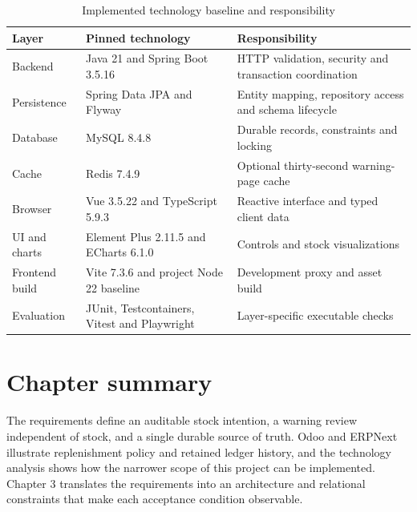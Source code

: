 \begin{table}[htbp]\centering\small{}\setlength{\tabcolsep}{3pt}\renewcommand{\arraystretch}{1.25}
\caption{Implemented technology baseline and responsibility}\label{tab:stack}
\begin{tabular}{>{\raggedright\arraybackslash}p{}>{\raggedright\arraybackslash}p{}>{\raggedright\arraybackslash}p{}}
\toprule
\textbf{Layer} & \textbf{Pinned technology} & \textbf{Responsibility} \\
\midrule
\leavevmode{}Backend & \leavevmode{}Java 21 and Spring Boot 3.5.16 & \leavevmode{}HTTP validation, security and transaction coordination \\
\leavevmode{}Persistence & \leavevmode{}Spring Data JPA and Flyway & \leavevmode{}Entity mapping, repository access and schema lifecycle \\
\leavevmode{}Database & \leavevmode{}MySQL 8.4.8 & \leavevmode{}Durable records, constraints and locking \\
\leavevmode{}Cache & \leavevmode{}Redis 7.4.9 & \leavevmode{}Optional thirty-second warning-page cache \\
\leavevmode{}Browser & \leavevmode{}Vue 3.5.22 and TypeScript 5.9.3 & \leavevmode{}Reactive interface and typed client data \\
\leavevmode{}UI and charts & \leavevmode{}Element Plus 2.11.5 and ECharts 6.1.0 & \leavevmode{}Controls and stock visualizations \\
\leavevmode{}Frontend build & \leavevmode{}Vite 7.3.6 and project Node 22 baseline & \leavevmode{}Development proxy and asset build \\
\leavevmode{}Evaluation & \leavevmode{}JUnit, Testcontainers, Vitest and Playwright & \leavevmode{}Layer-specific executable checks \\
\bottomrule\end{tabular}\end{table}

\FloatBarrier

\section{Chapter summary}

The requirements define an auditable stock intention, a warning review independent of stock, and a single durable source of truth. Odoo and ERPNext illustrate replenishment policy and retained ledger history, and the technology analysis shows how the narrower scope of this project can be implemented. Chapter 3 translates the requirements into an architecture and relational constraints that make each acceptance condition observable.
